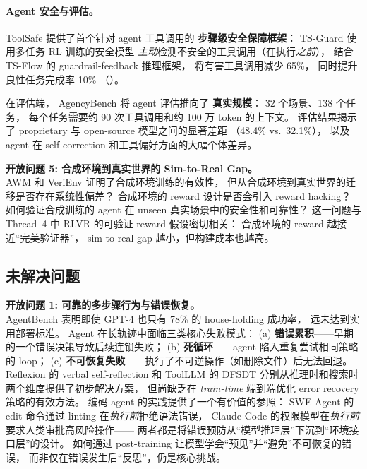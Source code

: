 \paragraph{Agent 安全与评估。}
ToolSafe \cite{mou2026toolsafe} 提供了首个针对 agent 工具调用的
\textbf{步骤级安全保障框架}：
TS-Guard 使用多任务 RL 训练的安全模型
\emph{主动}检测不安全的工具调用（在执行\emph{之前}），
结合 TS-Flow 的 guardrail-feedback 推理框架，
将有害工具调用减少 65\%，
同时提升良性任务完成率 10\%
（）。

在评估端，
AgencyBench \cite{li2026agencybench} 将 agent 评估推向了
\textbf{真实规模}：
32 个场景、138 个任务，
每个任务需要约 90 次工具调用和约 100 万 token 的上下文。
评估结果揭示了 proprietary 与 open-source 模型之间的显著差距
（48.4\% vs.\ 32.1\%），
以及 agent 在 self-correction 和工具偏好方面的大幅个体差异。

\begin{openproblembox}
\textbf{开放问题 5: 合成环境到真实世界的 Sim-to-Real Gap。}\\
AWM 和 VeriEnv 证明了合成环境训练的有效性，
但从合成环境到真实世界的迁移是否存在系统性偏差？
合成环境的 reward 设计是否会引入 reward hacking？
如何验证合成训练的 agent 在 unseen 真实场景中的安全性和可靠性？
这一问题与 Thread~4 中 RLVR 的可验证 reward 假设密切相关：
合成环境的 reward 越接近``完美验证器''，
sim-to-real gap 越小，但构建成本也越高。
\end{openproblembox}

\subsection{未解决问题}
\label{sec:t6-open}

\begin{openproblembox}
\textbf{开放问题 1: 可靠的多步骤行为与错误恢复。}\\
AgentBench 表明即使 GPT-4 也只有 78\% 的 house-holding 成功率，
远未达到实用部署标准。
Agent 在长轨迹中面临三类核心失败模式：
(a) \textbf{错误累积}——早期的一个错误决策导致后续连锁失败；
(b) \textbf{死循环}——agent 陷入重复尝试相同策略的 loop；
(c) \textbf{不可恢复失败}——执行了不可逆操作（如删除文件）后无法回退。
Reflexion 的 verbal self-reflection 和 ToolLLM 的 DFSDT
分别从推理时和搜索时两个维度提供了初步解决方案，
但尚缺乏在 \emph{train-time} 端到端优化 error recovery 策略的有效方法。
编码 agent 的实践提供了一个有价值的参照：
SWE-Agent 的 edit 命令通过 linting 在\emph{执行前}拒绝语法错误，
Claude Code 的权限模型在\emph{执行前}要求人类审批高风险操作——
两者都是将错误预防从``模型推理层''下沉到``环境接口层''的设计。
如何通过 post-training 让模型学会``预见''并``避免''不可恢复的错误，
而非仅在错误发生后``反思''，仍是核心挑战。
\end{openproblembox}

